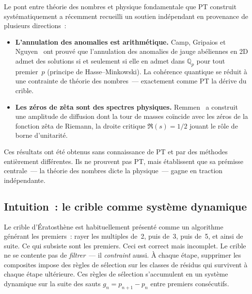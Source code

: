 \documentclass[12pt,a4paper]{article}
\begin{document}
\begin{remarque}
\label{rem:ch1_convergence}
Le pont entre théorie des nombres et physique fondamentale que PT
construit systématiquement a récemment recueilli un soutien
indépendant en provenance de plusieurs directions~:
\begin{itemize}[nosep]
\item \textbf{L'annulation des anomalies est arithmétique.}
  Camp, Gripaios et Nguyen~\cite{CampGripaiosNguyen2024} ont prouvé
  que l'annulation des anomalies de jauge abéliennes en 2D admet des
  solutions si et seulement si elle en admet dans $\mathbb{Q}_p$ pour
  tout premier~$p$ (principe de Hasse--Minkowski).
  La cohérence quantique se réduit à une contrainte de théorie des
  nombres~--- exactement comme PT la dérive du crible.
\item \textbf{Les zéros de zêta sont des spectres physiques.}
  Remmen~\cite{Remmen2021} a construit une amplitude de diffusion
  dont la tour de masses coïncide avec les zéros de la fonction zêta
  de Riemann, la droite critique $\Re(s) = 1/2$ jouant le rôle de
  borne d'unitarité.
\end{itemize}
Ces résultats ont été obtenus sans connaissance de PT et par des
méthodes entièrement différentes. Ils ne prouvent pas PT, mais
établissent que sa prémisse centrale~--- la théorie des nombres dicte
la physique~--- gagne en traction indépendante.
\end{remarque}

\subsection{Intuition~: le crible comme système dynamique}
\label{sec:ch1_intuition}

Le crible d'Ératosthène est habituellement présenté comme un
algorithme générant les premiers~: rayer les multiples de~2, puis
de~3, puis de~5, et ainsi de suite. Ce qui subsiste sont les premiers.
Ceci est correct mais incomplet. Le crible ne se contente pas de
\emph{filtrer}~--- il \emph{contraint} aussi. À chaque étape, supprimer
les composites impose des règles de sélection sur les classes de
résidus qui survivent à chaque étape ultérieure. Ces règles de
sélection s'accumulent en un système dynamique sur la suite des sauts
$g_n = p_{n+1} - p_n$ entre premiers consécutifs.
\end{document}
